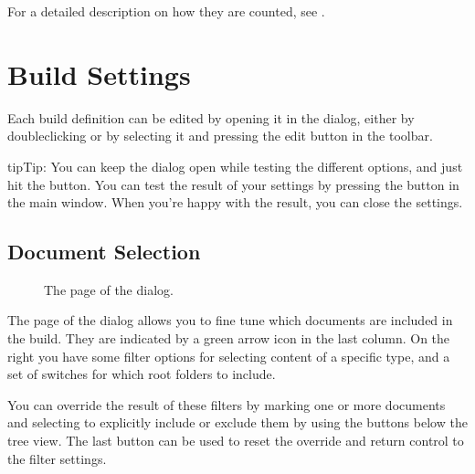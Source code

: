 \documentclass[a4paper,11pt,english]{sphinxmanual}
\begin{document}
\sphinxAtStartPar
For a detailed description on how they are counted, see {\hyperref[\detokenize{more_counting:a-counting}]{}}.


\section{Build Settings}
\label{\detokenize{project_manuscript:build-settings}}\label{\detokenize{project_manuscript:a-manuscript-settings}}
\sphinxAtStartPar
Each build definition can be edited by opening it in the  dialog,
either by double\sphinxhyphen{}clicking or by selecting it and pressing the edit button in the toolbar.

\begin{sphinxadmonition}{tip}{Tip:}
\sphinxAtStartPar
You can keep the  dialog open while testing the different options,
and just hit the  button. You can test the result of your settings by pressing
the  button in the main  window. When you’re happy with
the result, you can close the settings.
\end{sphinxadmonition}


\subsection{Document Selection}
\label{\detokenize{project_manuscript:document-selection}}
\begin{figure}[htbp]
\centering
\capstart

\noindent{}
\caption{The  page of the  dialog.}\label{\detokenize{project_manuscript:id3}}\end{figure}

\sphinxAtStartPar
The  page of the  dialog allows you to fine tune which
documents are included in the build. They are indicated by a green arrow icon in the last column.
On the right you have some filter options for selecting content of a specific type, and a set of
switches for which root folders to include.

\sphinxAtStartPar
You can override the result of these filters by marking one or more documents and selecting to
explicitly include or exclude them by using the buttons below the tree view. The last button can be
used to reset the override and return control to the filter settings.
\end{document}
